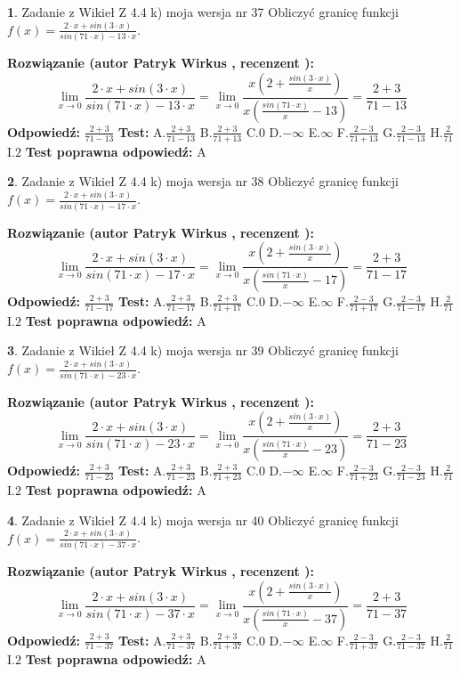 \documentclass[12pt, a4paper]{article}
\theoremstyle{definition} %
\newtheorem{zad}{}
\newcommand{\zadStart}[1]{\begin{zad}#1\newline}
\newcommand{\zadStop}{\end{zad}}
\newcommand{\rozwStart}[2]{\noindent \textbf{Rozwiązanie (autor #1 , recenzent #2): }\newline}
\newcommand{\rozwStop}{\newline}
\newcommand{\odpStart}{\noindent \textbf{Odpowiedź:}\newline}
\newcommand{\odpStop}{\newline}
\newcommand{\testStart}{\noindent \textbf{Test:}\newline}
\newcommand{\testStop}{\newline}
\newcommand{\kluczStart}{\noindent \textbf{Test poprawna odpowiedź:}\newline}
\newcommand{\kluczStop}{\newline}
\begin{document}
\zadStart{Zadanie z Wikieł Z 4.4 k) moja wersja nr 37}
Obliczyć granicę funkcji $f(x)=\frac{2\cdot x +sin(3\cdot x)}{sin(71\cdot x) -13\cdot x}$.
\zadStop
\rozwStart{Patryk Wirkus}{}
$$\lim\limits_{x\to 0}\frac{2\cdot x +sin(3\cdot x)}{sin(71\cdot x) -13\cdot x}
=\lim\limits_{x\to 0}\frac{x(2+\frac{sin(3\cdot x)}{x})}{x(\frac{sin(71\cdot x)}{x}-13)}
=\frac{2+3}{71-13}$$
\rozwStop
\odpStart
$\frac{2+3}{71-13}$
\odpStop
\testStart
A.$\frac{2+3}{71-13}$
B.$\frac{2+3}{71+13}$
C.$0$
D.$-\infty$
E.$\infty$
F.$\frac{2-3}{71+13}$
G.$\frac{2-3}{71-13}$
H.$\frac{2}{71}$
I.$2$
\testStop
\kluczStart
A
\kluczStop



\zadStart{Zadanie z Wikieł Z 4.4 k) moja wersja nr 38}
Obliczyć granicę funkcji $f(x)=\frac{2\cdot x +sin(3\cdot x)}{sin(71\cdot x) -17\cdot x}$.
\zadStop
\rozwStart{Patryk Wirkus}{}
$$\lim\limits_{x\to 0}\frac{2\cdot x +sin(3\cdot x)}{sin(71\cdot x) -17\cdot x}
=\lim\limits_{x\to 0}\frac{x(2+\frac{sin(3\cdot x)}{x})}{x(\frac{sin(71\cdot x)}{x}-17)}
=\frac{2+3}{71-17}$$
\rozwStop
\odpStart
$\frac{2+3}{71-17}$
\odpStop
\testStart
A.$\frac{2+3}{71-17}$
B.$\frac{2+3}{71+17}$
C.$0$
D.$-\infty$
E.$\infty$
F.$\frac{2-3}{71+17}$
G.$\frac{2-3}{71-17}$
H.$\frac{2}{71}$
I.$2$
\testStop
\kluczStart
A
\kluczStop



\zadStart{Zadanie z Wikieł Z 4.4 k) moja wersja nr 39}
Obliczyć granicę funkcji $f(x)=\frac{2\cdot x +sin(3\cdot x)}{sin(71\cdot x) -23\cdot x}$.
\zadStop
\rozwStart{Patryk Wirkus}{}
$$\lim\limits_{x\to 0}\frac{2\cdot x +sin(3\cdot x)}{sin(71\cdot x) -23\cdot x}
=\lim\limits_{x\to 0}\frac{x(2+\frac{sin(3\cdot x)}{x})}{x(\frac{sin(71\cdot x)}{x}-23)}
=\frac{2+3}{71-23}$$
\rozwStop
\odpStart
$\frac{2+3}{71-23}$
\odpStop
\testStart
A.$\frac{2+3}{71-23}$
B.$\frac{2+3}{71+23}$
C.$0$
D.$-\infty$
E.$\infty$
F.$\frac{2-3}{71+23}$
G.$\frac{2-3}{71-23}$
H.$\frac{2}{71}$
I.$2$
\testStop
\kluczStart
A
\kluczStop



\zadStart{Zadanie z Wikieł Z 4.4 k) moja wersja nr 40}
Obliczyć granicę funkcji $f(x)=\frac{2\cdot x +sin(3\cdot x)}{sin(71\cdot x) -37\cdot x}$.
\zadStop
\rozwStart{Patryk Wirkus}{}
$$\lim\limits_{x\to 0}\frac{2\cdot x +sin(3\cdot x)}{sin(71\cdot x) -37\cdot x}
=\lim\limits_{x\to 0}\frac{x(2+\frac{sin(3\cdot x)}{x})}{x(\frac{sin(71\cdot x)}{x}-37)}
=\frac{2+3}{71-37}$$
\rozwStop
\odpStart
$\frac{2+3}{71-37}$
\odpStop
\testStart
A.$\frac{2+3}{71-37}$
B.$\frac{2+3}{71+37}$
C.$0$
D.$-\infty$
E.$\infty$
F.$\frac{2-3}{71+37}$
G.$\frac{2-3}{71-37}$
H.$\frac{2}{71}$
I.$2$
\testStop
\kluczStart
A
\kluczStop
\end{document}
